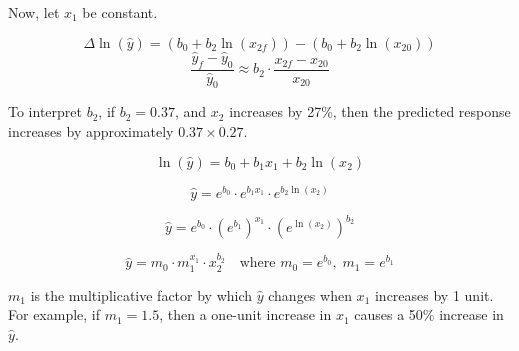 \documentclass[12pt]{article}
\begin{document}
\begin{enumerate}
Now, let \( x_1 \) be constant.

\[
\Delta \ln(\hat{y}) = \left( b_0 + b_2 \ln(x_{2f}) \right) - \left( b_0 + b_2 \ln(x_{20}) \right)
\]
\[
\frac{\hat{y}_f - \hat{y}_0}{\hat{y}_0} \approx b_2 \cdot \frac{x_{2f} - x_{20}}{x_{20}}
\]

To interpret \( b_2 \), if \( b_2 = 0.37 \), and \( x_2 \) increases by 27\%, then the predicted response increases by approximately \( 0.37 \times 0.27 \).


\[
\ln(\hat{y}) = b_0 + b_1 x_1 + b_2 \ln(x_2)
\]

\[
\hat{y} = e^{b_0} \cdot e^{b_1 x_1} \cdot e^{b_2 \ln(x_2)}
\]

\[
\hat{y} = e^{b_0} \cdot (e^{b_1})^{x_1} \cdot (e^{\ln(x_2)})^{b_2}
\]

\[
\hat{y} = m_0 \cdot m_1^{x_1} \cdot x_2^{b_2}
\quad \text{where } m_0 = e^{b_0}, \; m_1 = e^{b_1}
\]

\vspace{1em}

\( m_1 \) is the multiplicative factor by which \( \hat{y} \) changes when \( x_1 \) increases by 1 unit.  
For example, if \( m_1 = 1.5 \), then a one-unit increase in \( x_1 \) causes a 50\% increase in \( \hat{y} \).

\end{enumerate}



\end{document}
